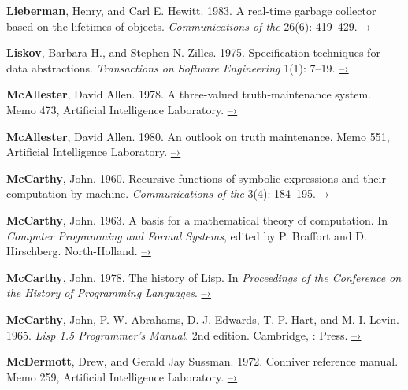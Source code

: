  \label{Lieberman and Hewitt 1983}
\textbf{Lieberman}, Henry, and Carl E. Hewitt. 1983. A real-time garbage collector based
on the lifetimes of objects. \textit{Communications of the }
26(6): 419--429.
\href{http://dspace.mit.edu/handle/1721.1/6335}{–›}

 \label{Liskov and Zilles (1975)}
\textbf{Liskov}, Barbara H., and Stephen N. Zilles.  1975.  Specification techniques for
data abstractions.  \textit{ Transactions on Software Engineering}
1(1): 7--19.
\href{http://csg.csail.mit.edu/CSGArchives/memos/Memo-117.pdf}{–›}

 \label{McAllester (1978; 1980)}
\textbf{McAllester}, David Allen.  1978.  A three-valued truth-maintenance system.  Memo
473,  Artificial Intelligence Laboratory.
\href{http://dspace.mit.edu/handle/1721.1/6296}{–›}

\textbf{McAllester}, David Allen.  1980.  An outlook on truth maintenance.  Memo 551,
 Artificial Intelligence Laboratory.
\href{http://dspace.mit.edu/handle/1721.1/6327}{–›}

 \label{McCarthy 1960}
\textbf{McCarthy}, John.  1960.  Recursive functions of symbolic expressions and their
computation by machine.  \textit{Communications of the }
3(4): 184--195.
\href{http://www-formal.stanford.edu/jmc/recursive.pdf}{–›}

 \label{McCarthy 1963}
\textbf{McCarthy}, John.  1963.  A basis for a mathematical theory of computation.  In
\textit{Computer Programming and Formal Systems}, edited by P. Braffort and
D. Hirschberg.  North-Holland.
\href{http://www-formal.stanford.edu/jmc/basis.html}{–›}

 \label{McCarthy 1978}
\textbf{McCarthy}, John.  1978.  The history of Lisp.  In \textit{Proceedings of the
  Conference on the History of Programming
Languages}.
\href{http://www-formal.stanford.edu/jmc/history/lisp/lisp.html}{–›}

 \label{McCarthy et al. 1965}
\textbf{McCarthy}, John, P. W. Abrahams, D. J. Edwards, T. P. Hart, and M. I.  Levin.
1965.  \textit{Lisp 1.5 Programmer’s Manual}.  2nd edition.  Cambridge, :
 Press.
\href{http://www.softwarepreservation.org/projects/LISP/book/LISP\%201.5\%20Programmers\%20Manual.pdf/view}{–›}

 \label{McDermott and Sussman (1972)}
\textbf{McDermott}, Drew, and Gerald Jay Sussman.  1972. Conniver reference manual.
Memo 259,  Artificial Intelligence Laboratory.
\href{http://dspace.mit.edu/handle/1721.1/6203}{–›}

